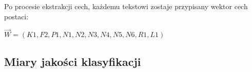 \documentclass{classrep}
\begin{document}
Po procesie ekstrakcji cech, każdemu tekstowi zostaje przypisany wektor cech postaci:
\begin{center}
  $\vec{W} = (K1, F2, P1, N1, N2, N3, N4, N5, N6, R1, L1)$
\end{center}


\subsection{Miary jakości klasyfikacji}
\end{document}
